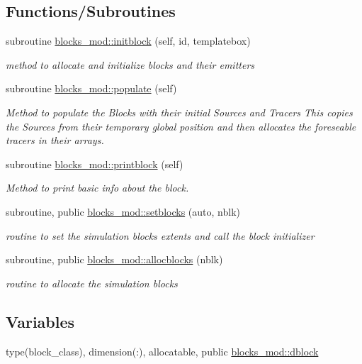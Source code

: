 \subsection*{Functions/\+Subroutines}
\begin{DoxyCompactItemize}
\item 
subroutine \hyperlink{namespaceblocks__mod_a534ca69b17b6f54ee07f995b02feff39}{blocks\+\_\+mod\+::initblock} (self, id, templatebox)
\begin{DoxyCompactList}\small\item\em method to allocate and initialize blocks and their emitters \end{DoxyCompactList}\item 
subroutine \hyperlink{namespaceblocks__mod_a7585844eb1b43604c04cb7a24c56205e}{blocks\+\_\+mod\+::populate} (self)
\begin{DoxyCompactList}\small\item\em Method to populate the Blocks with their initial Sources and Tracers This copies the Sources from their temporary global position and then allocates the foreseable tracers in their arrays. \end{DoxyCompactList}\item 
subroutine \hyperlink{namespaceblocks__mod_a6eab8b323cb15dcecb5c6b0c31b4e246}{blocks\+\_\+mod\+::printblock} (self)
\begin{DoxyCompactList}\small\item\em Method to print basic info about the block. \end{DoxyCompactList}\item 
subroutine, public \hyperlink{namespaceblocks__mod_a3312d23e0268d67aaf99d579aa57d0e7}{blocks\+\_\+mod\+::setblocks} (auto, nblk)
\begin{DoxyCompactList}\small\item\em routine to set the simulation blocks extents and call the block initializer \end{DoxyCompactList}\item 
subroutine, public \hyperlink{namespaceblocks__mod_a639beb0fee2290d46353f4b4702d6711}{blocks\+\_\+mod\+::allocblocks} (nblk)
\begin{DoxyCompactList}\small\item\em routine to allocate the simulation blocks \end{DoxyCompactList}\end{DoxyCompactItemize}
\subsection*{Variables}
\begin{DoxyCompactItemize}
\item 
type(block\+\_\+class), dimension(\+:), allocatable, public \hyperlink{namespaceblocks__mod_ac8ad6e3cf7a812f95dadb592336aca50}{blocks\+\_\+mod\+::dblock}
\end{DoxyCompactItemize}
